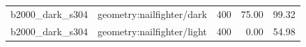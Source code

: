 \begin{longtable}{l>{\raggedright\arraybackslash}p{.42\linewidth}rrr}
b2000\_\allowbreak{}dark\_\allowbreak{}s304 & %
geometry:nailfighter/dark & %
400 & %
75.00 & %
99.32 \\ %

b2000\_\allowbreak{}dark\_\allowbreak{}s304 & %
geometry:nailfighter/light & %
400 & %
0.00 & %
54.98 \\ %


\end{longtable}
